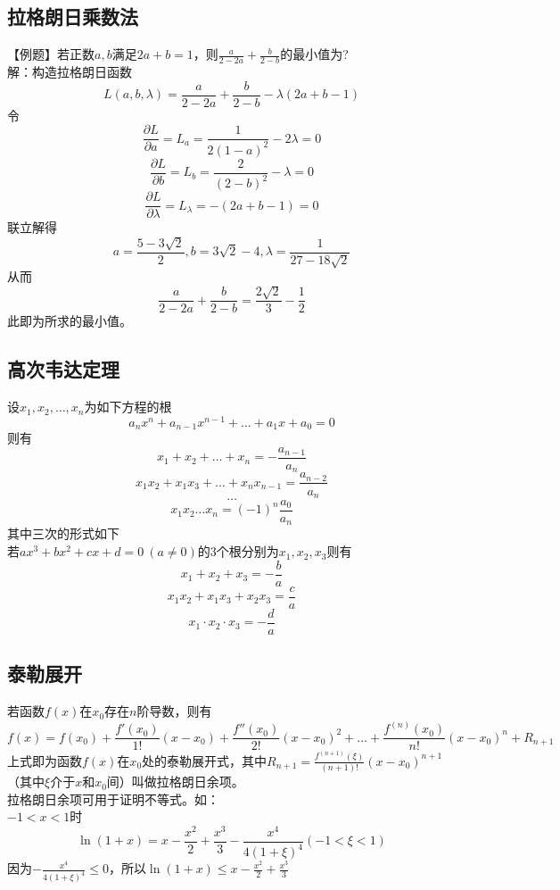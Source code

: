\documentclass[UTF8]{ctexart}
\begin{document}
		\subsection{拉格朗日乘数法}
			【例题】若正数$a,b$满足$2a+b=1$，则$\frac{a}{2-2a}+\frac{b}{2-b}$的最小值为?\\
			解：构造拉格朗日函数
			\[L(a,b,\lambda)=\frac{a}{2-2a}+\frac{b}{2-b}-\lambda(2a+b-1)\]
			令
			\[\frac{\partial L}{\partial a}=L_a=\frac{1}{2(1-a)^2}-2\lambda=0\]
			\[\frac{\partial L}{\partial b}=L_b=\frac{2}{(2-b)^2}-\lambda=0\]
			\[\frac{\partial L}{\partial \lambda}=L_\lambda=-(2a+b-1)=0\]
			联立解得
			\[a=\frac{5-3\sqrt{2}}{2},b=3\sqrt{2}-4,\lambda=\frac{1}{27-18\sqrt{2}}\]
			从而
			\[\frac{a}{2-2a}+\frac{b}{2-b}=\frac{2\sqrt{2}}{3}-\frac{1}{2}\]
			此即为所求的最小值。
		\subsection{高次韦达定理}
			设$x_1,x_2,\dots,x_n$为如下方程的根
			\[a_n x^n+a_{n-1} x^{n-1}+\dots+a_1 x+a_0=0\]
			则有
			\[x_1+x_2+\dots+x_n=-\frac{a_{n-1}}{a_n}\]
			\[x_1 x_2+x_1 x_3+\dots+x_n x_{n-1}=\frac{a_{n-2}}{a_n}\]
			\[\dots\]
			\[x_1 x_2\dots x_n=(-1)^n \frac{a_0}{a_n}\]
			其中三次的形式如下\\
			若$ax^3+bx^2+cx+d=0\ (a\neq 0)$的3个根分别为$x_1,x_2,x_3$则有
			\[x_1+x_2+x_3=-\frac{b}{a}\]
			\[x_1 x_2+x_1 x_3+x_2 x_3=\frac{c}{a}\]
			\[x_1\cdot x_2\cdot x_3=-\frac{d}{a}\]		
		\subsection{泰勒展开}
			若函数$f(x)$在$x_0$存在$n$阶导数，则有
			\[f(x)=f(x_0)+\frac{f'(x_0)}{1!}(x-x_0)+\frac{f''(x_0)}{2!}(x-x_0)^2+\dots+\frac{f^{(n)} (x_0)}{n!}(x-x_0)^n+R_{n+1}\]
			上式即为函数$f(x)$在$x_0$处的泰勒展开式，其中$R_{n+1}=\frac{f^{(n+1)} (\xi)}{(n+1)!}(x-x_0)^{n+1}$（其中$\xi$介于$x$和$x_0$间）叫做拉格朗日余项。\\
			拉格朗日余项可用于证明不等式。如：\\
			$-1<x<1$时
			\[\ln(1+x)=x-\frac{x^2}{2}+\frac{x^3}{3}-\frac{x^4}{4(1+\xi)^4} (-1<\xi<1)\]
			因为$-\frac{x^4}{4(1+\xi)^4}\leq 0$，所以$\ln(1+x)\leq x-\frac{x^2}{2}+\frac{x^3}{3}$
\end{document}
